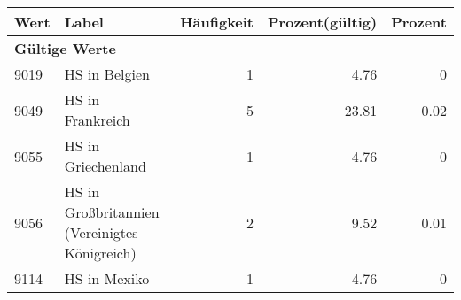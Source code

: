      \begin{longtable}{lXrrr}
     \toprule
     \textbf{Wert} & \textbf{Label} & \textbf{Häufigkeit} & \textbf{Prozent(gültig)} & \textbf{Prozent} \\
     \endhead
     \midrule
     \multicolumn{5}{l}{\textbf{Gültige Werte}}\\

     9019 &
     \multicolumn{1}{X}{ HS in Belgien   } &


       \num{1} &
       \num[round-mode=places,round-precision=2]{4,76} &
         \num[round-mode=places,round-precision=2]{0} \\

     9049 &
     \multicolumn{1}{X}{ HS in Frankreich   } &


       \num{5} &
       \num[round-mode=places,round-precision=2]{23,81} &
         \num[round-mode=places,round-precision=2]{0,02} \\

     9055 &
     \multicolumn{1}{X}{ HS in Griechenland   } &


       \num{1} &
       \num[round-mode=places,round-precision=2]{4,76} &
         \num[round-mode=places,round-precision=2]{0} \\

     9056 &
     \multicolumn{1}{X}{ HS in Großbritannien (Vereinigtes Königreich)   } &


       \num{2} &
       \num[round-mode=places,round-precision=2]{9,52} &
         \num[round-mode=places,round-precision=2]{0,01} \\

     9114 &
     \multicolumn{1}{X}{ HS in Mexiko   } &


       \num{1} &
       \num[round-mode=places,round-precision=2]{4,76} &
         \num[round-mode=places,round-precision=2]{0} \\


\end{longtable}
